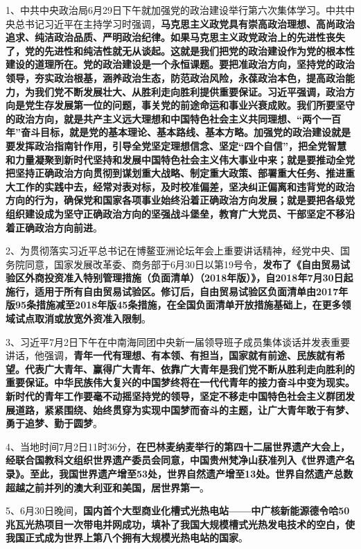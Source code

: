 1、中共中央政治局6月29日下午就加强党的政治建设举行第六次集体学习。中共中央总书记习近平在主持学习时强调，{\textbf{马克思主义政党具有崇高政治理想、高尚政治追求、纯洁政治品质、严明政治纪律。如果马克思主义政党政治上的先进性丧失了，党的先进性和纯洁性就无从谈起。这就是我们把党的政治建设作为党的根本性建设的道理所在。党的政治建设是一个永恒课题。要把准政治方向，坚持党的政治领导，夯实政治根基，涵养政治生态，防范政治风险，永葆政治本色，提高政治能力，为我们党不断发展壮大、从胜利走向胜利提供重要保证。习近平强调，政治方向是党生存发展第一位的问题，事关党的前途命运和事业兴衰成败。我们所要坚守的政治方向，就是共产主义远大理想和中国特色社会主义共同理想、``两个一百年''奋斗目标，就是党的基本理论、基本路线、基本方略。加强党的政治建设就是要发挥政治指南针作用，引导全党坚定理想信念、坚定``四个自信''，把全党智慧和力量凝聚到新时代坚持和发展中国特色社会主义伟大事业中来；就是要推动全党把坚持正确政治方向贯彻到谋划重大战略、制定重大政策、部署重大任务、推进重大工作的实践中去，经常对表对标，及时校准偏差，坚决纠正偏离和违背党的政治方向的行为，确保党和国家各项事业始终沿着正确政治方向发展；就是要把各级党组织建设成为坚守正确政治方向的坚强战斗堡垒，教育广大党员、干部坚定不移沿着正确政治方向前进}}。

2、为贯彻落实习近平总书记在博鳌亚洲论坛年会上重要讲话精神，经党中央、国务院同意，国家发展改革委、商务部于6月30日以第19号令，{\textbf{发布了《自由贸易试验区外商投资准入特别管理措施（负面清单）（2018年版）》，自2018年7月30日起施行，适用于所有自由贸易试验区。修订后，自由贸易试验区负面清单由2017年版95条措施减至2018年版45条措施，在全国负面清单开放措施基础上，在更多领域试点取消或放宽外资准入限制}}。

3、习近平7月2日下午在中南海同团中央新一届领导班子成员集体谈话并发表重要讲话，他强调，{\textbf{青年一代有理想、有本领、有担当，国家就有前途、民族就有希望。代表广大青年、赢得广大青年、依靠广大青年是我们党不断从胜利走向胜利的重要保证。中华民族伟大复兴的中国梦终将在一代代青年的接力奋斗中变为现实。新时代的青年工作要毫不动摇坚持党的领导，坚定不移走中国特色社会主义群团发展道路，紧紧围绕、始终贯穿为实现中国梦而奋斗的主题，让广大青年敢于有梦、勇于追梦、勤于圆梦}}。

4、当地时间7月2日11时36分，{\textbf{在巴林麦纳麦举行的第四十二届世界遗产大会上，经联合国教科文组织世界遗产委员会同意，中国贵州梵净山获准列入《世界遗产名录》。至此，我国世界遗产增至53处，世界自然遗产增至13处。世界自然遗产总数超越之前并列的澳大利亚和美国，居世界第一}}。

5、6月30日晚间，{\textbf{国内首个大型商业化槽式光热电站------中广核新能源德令哈50兆瓦光热项目一次带电并网成功，填补了我国大规模槽式光热发电技术的空白，使我国正式成为世界上第八个拥有大规模光热电站的国家}}。


